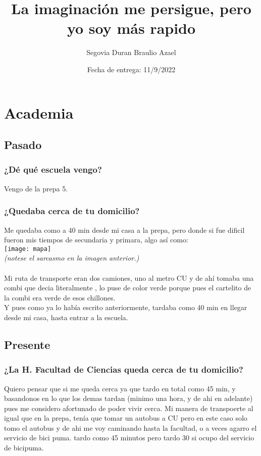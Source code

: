 \documentclass[12pt,a4paper]{article}
\title{La imaginación me persigue, pero yo soy más rapido}
\author{Segovia Duran Braulio Azael }
\date{Fecha de entrega: 11/9/2022}
\begin{document}
\maketitle

\section*{Academia}
\subsection*{Pasado}
\subsubsection*{¿Dé qué escuela vengo?}
Vengo de la prepa 5.
\subsubsection*{¿Quedaba cerca de tu domicilio?}
Me quedaba como a 40 min desde mi casa a la prepa, pero donde si fue dificil fueron mis tiempos de secundaria y primara, algo así como:\\
\texttt{[image: mapa]}\\
{{\small\it (notese el sarcasmo en la imagen anterior.)}}\\\\
Mi ruta de transporte eran dos camiones, uno al metro CU y de ahí tomaba una combi que decia literalmente {\sl{}} , lo puse de color verde porque pues el cartelito de la combi era verde de esos chillones.\\
Y pues como ya lo había escrito anteriormente, tardaba como 40 min en llegar desde mi casa, hasta entrar a la escuela.


\subsection*{Presente}
\subsubsection*{¿La H. Facultad de Ciencias queda cerca de tu domicilio?}
Quiero pensar que si me queda cerca ya que tardo en total como 45 min, y basandonos en lo que los demas tardan (minimo una hora, y de ahi en adelante) pues me considero afortunado de poder vivir cerca. Mi manera de transpoerte al igual que en la prepa, tenía que tomar un autobus a CU pero en este caso solo tomo el autobus y de ahi me voy caminando hasta la facultad, o a veces agarro el servicio de bici puma.
tardo como 45 minutos pero tardo 30 si ocupo del servicio de bicipuma.\\
\end{document}
